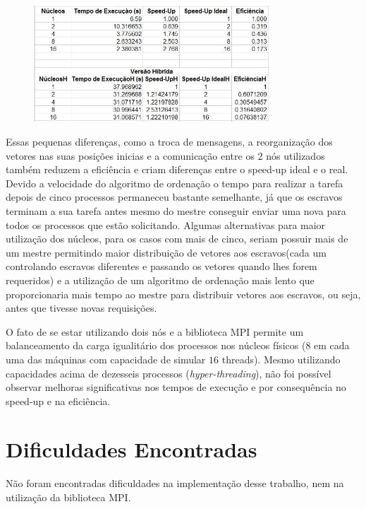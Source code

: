 \documentclass[11pt]{IEEEtran}
\begin{document}
	\begin{figure}[H]
		\centering
		\includegraphics[width=88mm]{table.png}
		\label{fig_table}
	\end{figure}

	Essas pequenas diferenças, como a troca de mensagens, a reorganização dos
	vetores nas suas posições inicias e a comunicação entre os 2 nós utilizados
	também reduzem a eficiência e criam diferenças entre o speed-up ideal e o
	real. Devido a velocidade do algoritmo de ordenação o tempo para realizar a
	tarefa depois de cinco processos permaneceu bastante semelhante, já que os
	escravos terminam a sua tarefa antes mesmo do mestre conseguir enviar uma
	nova para todos os processos que estão solicitando.  Algumas alternativas
	para maior utilização dos núcleos, para os casos com mais de cinco, seriam
	possuir mais de um mestre permitindo maior distribuição de vetores aos
	escravos(cada um controlando escravos diferentes e passando os vetores
	quando lhes forem requeridos) e a utilização de um algoritmo de ordenação
	mais lento que proporcionaria mais tempo ao mestre para distribuir vetores
	aos escravos, ou seja, antes que tivesse novas requisições.

	O fato de se estar utilizando dois nós e a biblioteca MPI permite um
	balanceamento da carga igualitário dos processos nos núcleos físicos ($8$ em
	cada uma das máquinas com capacidade de simular $16$ threads). Mesmo
	utilizando capacidades acima de dezesseis processos
	(\emph{hyper-threading}), não foi possível observar melhoras significativas
	nos tempos de execução e por consequência no speed-up e na eficiência.

\section{Dificuldades Encontradas}

	Não foram encontradas dificuldades na implementação desse trabalho, nem na
	utilização da biblioteca MPI\@.
\end{document}
